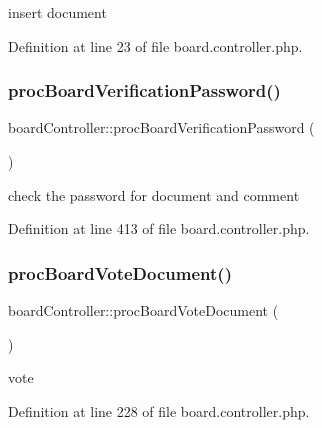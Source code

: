 insert document 



Definition at line 23 of file board.\+controller.\+php.

\hypertarget{classboardController_a0e52095fdfe92ab0533ac33e329e31c6}{}\label{classboardController_a0e52095fdfe92ab0533ac33e329e31c6} 
\subsubsection{\texorpdfstring{proc\+Board\+Verification\+Password()}{procBoardVerificationPassword()}}
{\footnotesize\ttfamily board\+Controller\+::proc\+Board\+Verification\+Password (\begin{DoxyParamCaption}{ }\end{DoxyParamCaption})}



check the password for document and comment 



Definition at line 413 of file board.\+controller.\+php.

\hypertarget{classboardController_a8ff91d133ca5ca109b91f218ff306738}{}\label{classboardController_a8ff91d133ca5ca109b91f218ff306738} 
\subsubsection{\texorpdfstring{proc\+Board\+Vote\+Document()}{procBoardVoteDocument()}}
{\footnotesize\ttfamily board\+Controller\+::proc\+Board\+Vote\+Document (\begin{DoxyParamCaption}{ }\end{DoxyParamCaption})}



vote 



Definition at line 228 of file board.\+controller.\+php.

\hypertarget{classboardController_a1f462e1fe4adab5463f527be6f0dd2b9}{}\label{classboardController_a1f462e1fe4adab5463f527be6f0dd2b9} 
